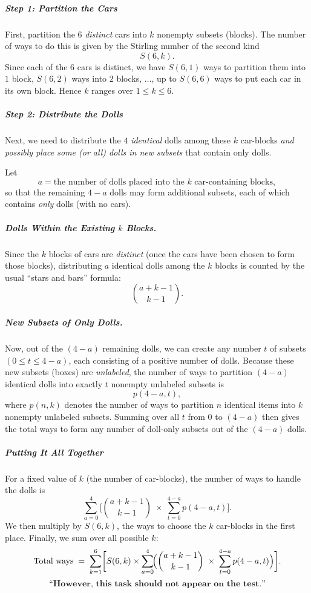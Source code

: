 \documentclass[docmute]{article}
\begin{document}
\subparagraph*{Step 1: Partition the Cars}

First, partition the \(6\) \emph{distinct} cars into \(k\) nonempty subsets (blocks).  
The number of ways to do this is given by the Stirling number of the second kind 
\[
S(6,k).
\]
Since each of the \(6\) cars is distinct, we have 
\(S(6,1)\) ways to partition them into \(1\) block, 
\(S(6,2)\) ways into \(2\) blocks, \(\dots\), up to 
\(S(6,6)\) ways to put each car in its own block.  
Hence \(k\) ranges over \(1 \le k \le 6\).

\subparagraph*{Step 2: Distribute the Dolls}

Next, we need to distribute the \(4\) \emph{identical} dolls among these \(k\) car-blocks 
\emph{and possibly place some (or all) dolls in new subsets} that contain only dolls.

Let
\[
a = \text{the number of dolls placed into the }k\text{ car-containing blocks},
\]
so that the remaining \(4-a\) dolls may form additional subsets, each of which contains \emph{only} dolls (with no cars).

\subparagraph{Dolls Within the Existing \(k\) Blocks.}

Since the \(k\) blocks of cars are \emph{distinct} (once the cars have been chosen to form those blocks), distributing \(a\) identical dolls among the \(k\) blocks is counted by the usual ``stars and bars'' formula:
\[
\binom{a + k - 1}{k - 1}.
\]

\subparagraph{New Subsets of Only Dolls.}

Now, out of the \((4 - a)\) remaining dolls, we can create any number \(t\) of subsets \((0 \le t \le 4-a)\), each consisting of a positive number of dolls.  
Because these new subsets (boxes) are \emph{unlabeled}, the number of ways to partition \((4 - a)\) identical dolls into exactly \(t\) nonempty unlabeled subsets is
\[
p(4 - a, t),
\]
where \(p(n, k)\) denotes the number of ways to partition \(n\) identical items into \(k\) nonempty unlabeled subsets.  
Summing over all \(t\) from \(0\) to \((4-a)\) then gives the total ways to form any number of doll-only subsets out of the \((4 - a)\) dolls.

\subparagraph{Putting It All Together}

For a fixed value of \(k\) (the number of car-blocks), the number of ways to handle the dolls is
\[
\sum_{a=0}^{4}
\Biggl[
  \binom{a + k - 1}{k - 1}
  \;\times\;
  \sum_{t=0}^{4 - a} p(4 - a, t)
\Biggr].
\]
We then multiply by \(S(6,k)\), the ways to choose the \(k\) car-blocks in the first place.  
Finally, we sum over all possible \(k\):
\[
\text{Total ways}
\;=\;
\sum_{k=1}^{6}
\biggl[
  S(6,k)
  \times
  \sum_{a=0}^{4}\!\Bigl(
      \binom{a + k - 1}{k - 1}
      \;\times\;
      \sum_{t=0}^{4-a} p(4 - a, t)
  \Bigr)
\biggr].
\]
\[
\textbf{``However, this task should not appear on the test.''}
\]
\end{document}
